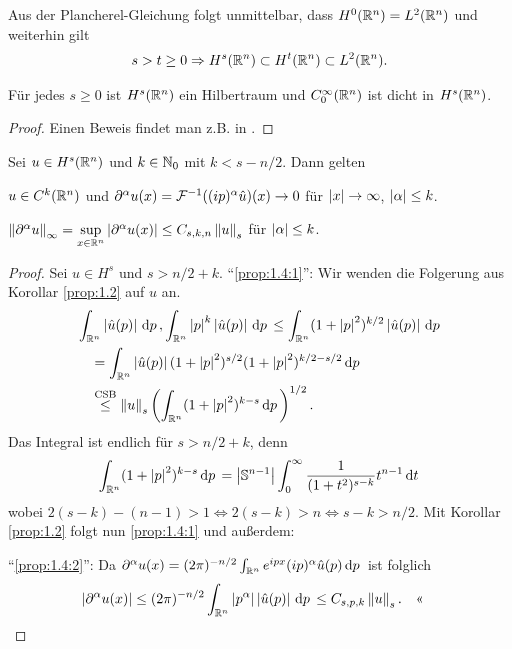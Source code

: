 Aus der Plancherel-Gleichung folgt unmittelbar, dass $H^0(\mathbb{R}^n)=L^2(\mathbb{R}^n)$ und
weiterhin gilt
\begin{align*}
s> t\ge 0\Rightarrow H^s(\mathbb{R}^n)\subset H^t(\mathbb{R}^n)\subset L^2(\mathbb{R}^n).
\end{align*}

\begin{prop}
\label{prop:1.3}
Für jedes $s\ge 0$ ist $H^s(\mathbb{R}^n)$ ein Hilbertraum und $C_0^\infty(\mathbb{R}^n)$ ist
dicht in $H^s(\mathbb{R}^n)$.\fishhere
\end{prop}
\begin{proof}
Einen Beweis findet man z.B. in \cite{Fun07}.\qedhere
\end{proof}

\begin{thm}
\label{prop:1.4}
Sei $u\in H^s(\mathbb{R}^n)$ und $k\in\mathbb{N}_0$ mit $k< s- n/2$. Dann gelten
\begin{propenum}
\item\label{prop:1.4:1} $u\in C^k(\mathbb{R}^n)$ und $\partial^\alpha u(x) =
\mathcal{F}^{-1}((ip)^\alpha \hat{u})(x)\to 0$ für $\left|x\right|\to\infty$, $\left|\alpha\right|\le
k$.
\item\label{prop:1.4:2} $\left\|\partial^\alpha u\right\|_\infty =
\sup\limits_{x\in\mathbb{R}^n} \left|\partial^\alpha u(x)\right| \le C_{s,k,n}\left\|u\right\|_s$ für
$\left|\alpha\right|\le k$.\fishhere
\end{propenum}
\end{thm}
\begin{proof}
Sei $u\in H^s$ und $s>n/2+k$.
``\ref{prop:1.4:1}'': Wir wenden die Folgerung aus Korollar \ref{prop:1.2} auf
$u$ an.
\begin{align*}
&\int_{\mathbb{R}^n} \left|\hat{u}(p)\right|\,\mathrm{d} p\,,
\int_{\mathbb{R}^n} \left|p\right|^k\left|\hat{u}(p)\right|\,\mathrm{d} p\,
\le
\int_{\mathbb{R}^n} (1+\left|p\right|^2)^{k/2}\left|\hat{u}(p)\right|\,\mathrm{d} p\,\\
&\quad=
\int_{\mathbb{R}^n} \left|\hat{u}(p)\right|(1+\left|p\right|^2)^{s/2}(1+\left|p\right|^2)^{k/2-s/2}\,\mathrm{d} p\,\\
&\quad\overset{\text{CSB}}{\le}
\left\|u\right\|_s \left(\int_{\mathbb{R}^n}
(1+\left|p\right|^2)^{k-s}\,\mathrm{d} p\,\right)^{1/2}.
\end{align*}
Das Integral ist endlich für $s > n/2+k$, denn
\begin{align*}
\int_{\mathbb{R}^n}
(1+\left|p\right|^2)^{k-s}\,\mathrm{d} p\,
= \left|\mathbb{S}^{n-1}\right|
\int_{0}^\infty
\frac{1}{(1+t^2)^{s-k}}t^{n-1}\,\mathrm{d} t\,
\end{align*}
wobei $2(s-k) - (n-1) > 1 \Leftrightarrow 2(s-k) > n\Leftrightarrow s-k > n/2$.
Mit Korollar \ref{prop:1.2} folgt nun \ref{prop:1.4:1} und außerdem:

``\ref{prop:1.4:2}'': Da
$\partial^\alpha u(x) = (2\pi)^{-n/2} \int_{\mathbb{R}^n} e^{ipx}(ip)^\alpha
\hat{u}(p)\,\mathrm{d} p\,$ ist folglich
\begin{align*}
\left|\partial^\alpha u(x)\right| 
&\le (2\pi)^{-n/2} \int_{\mathbb{R}^n} \left|p^\alpha\right|
\left|\hat{u}(p)\right|\,\mathrm{d} p\,
\le C_{s,p,k}\left\|u\right\|_s.\quad\text{<<}
\end{align*}
\end{proof}

